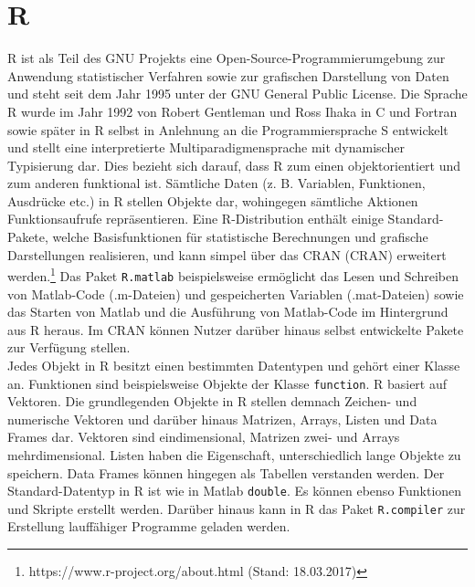 %


\section{R}

R ist als Teil des GNU Projekts eine Open-Source-Programmierumgebung zur Anwendung statistischer Verfahren sowie zur grafischen Darstellung von Daten und steht seit dem Jahr 1995 unter der GNU General Public License. Die Sprache R wurde im Jahr 1992 von Robert Gentleman und Ross Ihaka in C und Fortran sowie später in R selbst in Anlehnung an die Programmiersprache S entwickelt und stellt eine interpretierte Multiparadigmensprache mit dynamischer Typisierung dar. Dies bezieht sich darauf, dass R zum einen objektorientiert und zum anderen funktional ist. Sämtliche Daten (z. B. Variablen, Funktionen, Ausdrücke etc.) in R stellen Objekte dar, wohingegen sämtliche Aktionen Funktionsaufrufe repräsentieren. Eine R-Distribution enthält einige Standard-Pakete, welche Basisfunktionen für statistische Berechnungen und grafische Darstellungen realisieren, und kann simpel über das \acl{CRAN} (\acs{CRAN}) erweitert werden.\footnote{https://www.r-project.org/about.html (Stand: 18.03.2017)} Das Paket \texttt{R.matlab} beispielsweise ermöglicht das Lesen und Schreiben von Matlab-Code (.m-Dateien) und gespeicherten Variablen (.mat-Dateien) sowie das Starten von Matlab und die Ausführung von Matlab-Code im Hintergrund aus R heraus. Im \acs{CRAN} können Nutzer darüber hinaus selbst entwickelte Pakete zur Verfügung stellen. \parencite{adler_r_2012, manderscheid_sozialwissenschaftliche_2012}\\

Jedes Objekt in R besitzt einen bestimmten Datentypen und gehört einer Klasse an. Funktionen sind beispielsweise Objekte der Klasse \texttt{function}. R basiert auf Vektoren. Die grundlegenden Objekte in R stellen demnach Zeichen- und numerische Vektoren und darüber hinaus Matrizen, Arrays, Listen und Data Frames dar. Vektoren sind eindimensional, Matrizen zwei- und Arrays mehrdimensional. Listen haben die Eigenschaft, unterschiedlich lange Objekte zu speichern. Data Frames können hingegen als Tabellen verstanden werden. Der Standard-Datentyp in R ist wie in Matlab \texttt{double}. Es können ebenso Funktionen und Skripte erstellt werden. Darüber hinaus kann in R das Paket \texttt{R.compiler} zur Erstellung lauffähiger Programme geladen werden. \parencite{adler_r_2012, manderscheid_sozialwissenschaftliche_2012}\\

